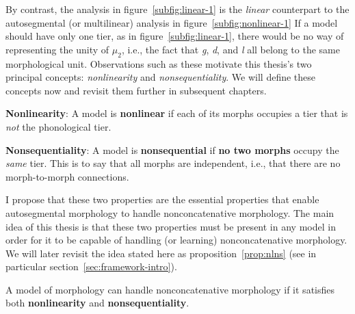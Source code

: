 By contrast, the analysis in figure~\ref{subfig:linear-1} is the \emph{linear} counterpart to the autosegmental  (or multilinear) analysis in figure~\ref{subfig:nonlinear-1}
If a model should have only one tier, as in 
figure~\ref{subfig:linear-1}, there would be no way of representing the
unity of $\mu_2$, i.e., the fact that \textit{g}, \textit{d}, and \textit{l}
all belong to the same morphological unit. Observations such as these motivate this thesis's two principal concepts: \emph{nonlinearity} and \emph{nonsequentiality}. We will define these concepts now and revisit them further in subsequent chapters. 
	\medskip
	\begin{definition}\label{def:nl}{\textbf{Nonlinearity}}: %
	A model is \textbf{nonlinear} if each of its morphs occupies a tier that is \emph{not} the phonological tier.
	\end{definition}
	\begin{definition}\label{def:ns}{\textbf{Nonsequentiality}}: %
	A model is \textbf{nonsequential} if \textbf{no two morphs} occupy the \emph{same} tier. This is to say that all morphs are independent, i.e., that there are no morph-to-morph connections.
	\end{definition}
	\medskip
I propose that these two properties are the essential properties that enable autosegmental morphology to handle nonconcatenative morphology. The main idea of this thesis is that these two properties must be present in any model in order for it to be capable of handling (or learning) nonconcatenative morphology.  We will later revisit the idea stated here as proposition~\ref{prop:nlns} (see in particular section~\ref{sec:framework-intro}).
\begin{proposition}\label{prop:nlns}
A model of morphology can handle nonconcatenative morphology if it satisfies both \textbf{nonlinearity} and \textbf{nonsequentiality}.
\end{proposition}
